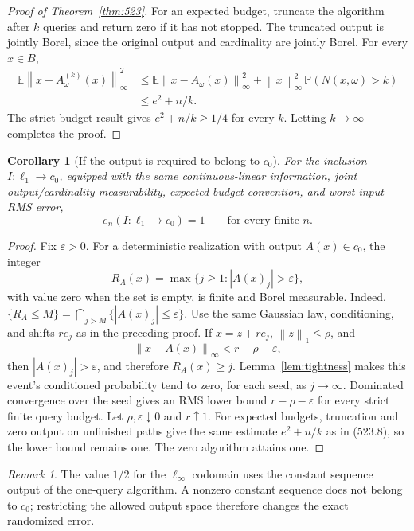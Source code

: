 \documentclass[11pt,a4paper]{article}
\newcommand{\E}{\mathbb E}
\newcommand{\Pbb}{\mathbb P}
\newcommand{\norm}[1]{\left\lVert#1\right\rVert}
\newcommand{\abs}[1]{\left\lvert#1\right\rvert}
\newtheorem{corollary}[theorem]{Corollary}
\theoremstyle{definition}
\theoremstyle{remark}
\newtheorem{remark}[theorem]{Remark}
\numberwithin{equation}{section}
\begin{document}
\begin{proof}[Proof of Theorem~\ref{thm:523}]
For an expected budget, truncate the algorithm after \(k\) queries
and return zero if it has not stopped. The truncated output is jointly
Borel, since the original output and cardinality are jointly Borel.
For every \(x\in B\),
\[
\begin{split}
 \E\norm{x-A^{(k)}_\omega(x)}_\infty^2
 &\le \E\norm{x-A_\omega(x)}_\infty^2
          +\norm x_\infty^2\,\Pbb(N(x,\omega)>k)\\
 &\le e^2+n/k .
\end{split}
 \tag{523.8}
\]
The strict-budget result gives \(e^2+n/k\ge1/4\) for every \(k\).
Letting \(k\to\infty\) completes the proof.
\end{proof}

\begin{corollary}[If the output is required to belong to \(c_0\)]
\label{cor:523-c0}
For the inclusion \(I:\ell_1\to c_0\), equipped with the same
continuous-linear information, joint output/cardinality measurability,
expected-budget convention, and worst-input RMS error,
\[
                    e_n(I:\ell_1\to c_0)=1
                 \qquad\text{for every finite }n.
\]
\end{corollary}
\begin{proof}
Fix \(\varepsilon>0\). For a deterministic realization with output
\(A(x)\in c_0\), the integer
\[
 R_A(x)=\max\{j\ge1:\abs{A(x)_j}>\varepsilon\},
\]
with value zero when the set is empty, is finite and Borel measurable.
Indeed, \(\{R_A\le M\}=\bigcap_{j>M}\{\abs{A(x)_j}\le\varepsilon\}\).
Use the same Gaussian law, conditioning, and shifts \(re_j\) as in
the preceding proof. If \(x=z+re_j\), \(\norm z_1\le\rho\), and
\[
                   \norm{x-A(x)}_\infty<r-\rho-\varepsilon,
\]
then \(\abs{A(x)_j}>\varepsilon\), and therefore \(R_A(x)\ge j\).
Lemma~\ref{lem:tightness} makes this event's conditioned
probability tend to zero, for each seed, as \(j\to\infty\).
Dominated convergence over the seed gives an RMS lower bound
\(r-\rho-\varepsilon\) for every strict finite query budget.
Let \(\rho,\varepsilon\downarrow0\) and \(r\uparrow1\).
For expected budgets, truncation and zero output on unfinished paths
give the same estimate \(e^2+n/k\) as in (523.8), so the lower
bound remains one. The zero algorithm attains one.
\end{proof}

\begin{remark}
The value \(1/2\) for the \(\ell_\infty\) codomain uses the constant
sequence output of the one-query algorithm. A nonzero constant
sequence does not belong to \(c_0\); restricting the allowed output
space therefore changes the exact randomized error.
\end{remark}
\end{document}

